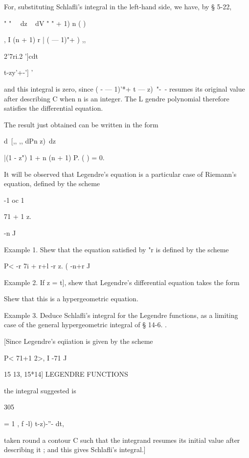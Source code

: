 For, substituting Schlafli's integral in the left-hand side, we have, 
by § 5-22, 

  "  "  ~~dz  ~   dV   "  " + 1)  n ( )   

, I   (n + 1) r   | ( — 1)"+  ) ,, 

  2'7ri.2 ']cdt\ \ {t-zy'+-'] ' 

and this integral is zero, since ( - — 1)'*+   t — z)~"-~- resumes its original value 
after describing C when n is an integer. The L gendre polynomial therefore 
satisfies the differential equation. 

The result just obtained can be written in the form 

d\  [,,  ,, dPn  z)\ 
dz 



|(1 - z")   1 + n (n + 1) P. ( ) = 0. 



It will be observed that Legendre's equation is a particular case of Riemann's equation, 
defined by the scheme 

-1 oc 1   

71 + 1 z.  

-n J 

Example 1. Shew that the equation satisfied by  "r is defined by the scheme 

P< -r 7i + r+l -r z.  
( -n+r J 

Example 2. If z  = t], shew that Legendre's differential equation takes the form 






Shew that this is a hypergeometric equation. 

Example 3. Deduce Schlafli's integral for the Legendre functions, as a limiting case of 
the general hypergeometric integral of § 14-6. . 

[Since Legendre's eqiiation is given by the scheme 

P< 71+1 2>, 
I -71 J 



15 13, 15*14] LEGENDRE FUNCTIONS 

the integral suggested is 



305 



= 1 , f -l)  t-z)-''- dt, 

taken round a contour C such that the integrand resumes its initial value after describing 
it ; and this gives Schlafli's integral.] 

}
